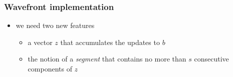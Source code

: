\begin{frame}[fragile]
%
  \frametitle{Wavefront implementation}
%
  \begin{itemize}
%
  \item we need two new features
    \begin{itemize}
    \item a vector $z$ that accumulates the updates to $b$
    \item the notion of a {\em segment} that contains no more than $s$ consecutive components of $z$
    \end{itemize}
%
  \end{itemize}
%
  \begin{center}
    \begin{minipage}{.85\linewidth}
      \begin{algorithm}[H]
%
          \dontprintsemicolon
          \nocaptionofalgo
          \setalcaphskip{0ex}
%
%
        \end{algorithm}
      \end{minipage}
    \end{center}
%
\end{frame}




